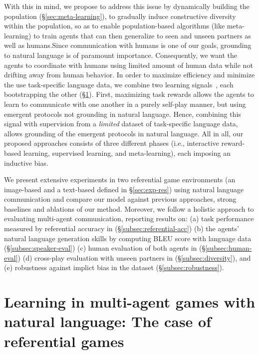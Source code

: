 \documentclass{article}
\begin{document}
With this in mind, we propose to address this issue by dynamically building the population (\S\ref{sec:meta-learning}), to gradually induce constructive diversity within the population, so as to enable population-based algorithms (like meta-learning) to train agents that can then generalize to seen and unseen partners as well as humans.Since communication with humans is one of our goals, grounding to natural language is of paramount importance. Consequently, we want the agents to coordinate with humans using limited amount of human data while not drifting away from human behavior. In order to maximize efficiency and minimize the use task-specific language data, we combine two learning signals~\citep{lazaridou-etal-2020-multi,lowe*2020on}, each bootstrapping the other (\S\ref{sec:learning}). First, maximizing task rewards allows the agents to learn to communicate with one another in a purely self-play manner, but using emergent protocols not grounding in natural language. Hence, combining this signal with supervision from a \emph{limited} dataset of task-specific language data, allows grounding of the emergent protocols in natural language. All in all, our proposed approaches consists of three different phases (i.e., interactive reward-based learning, supervised learning, and meta-learning), each imposing an inductive bias.

We present extensive experiments in two referential game environments (an image-based and a text-based defined in \S\ref{sec:exp-res}) using natural language communication and compare our model against previous approaches, strong baselines and ablations of our method. Moreover, we follow a holistic approach to evaluating multi-agent communication, reporting results on:
(a) task performance measured by referential accuracy in (\S\ref{subsec:referential-acc})
(b) the agents' natural language generation skills by computing BLEU score with language data (\S\ref{subsec:speaker-eval})
(c) human evaluation of both agents in (\S\ref{subsec:human-eval})
(d) cross-play evaluation with unseen partners in (\S\ref{subsec:diversity}), and
(e) robustness against implict bias in the dataset (\S\ref{subsec:robustness}).

\section{Learning in multi-agent games with natural language: The case of referential games}
\label{sec:learning}
\end{document}
